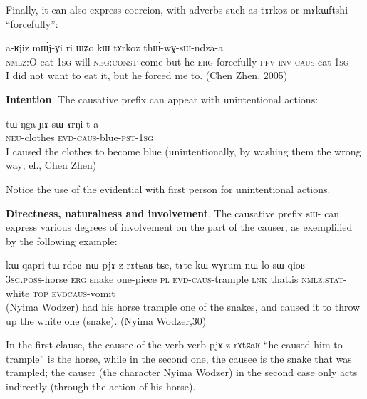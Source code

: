 \documentclass[oldfontcommands,oneside,a4paper,11pt]{article}
\newcommand{\ipa}[1]{{\phon \mbox{#1}}} %
\newcommand{\sg}{\textsc{sg}}
\newcommand{\pl}{\textsc{pl}}
\newcommand{\pfv}{\textsc{pfv}}
\newcommand{\auto}{\textsc{autoben}}
\newcommand{\caus}{\textsc{caus}}
\newcommand{\lnk}{\textsc{lnk}}
\newcommand{\testim}{\textsc{const}}
\newcommand{\erg}{\textsc{erg}}
\newcommand{\evd}{\textsc{evd}}
\newcommand{\inv}{\textsc{inv}}
\newcommand{\negat}{\textsc{neg}}
\newcommand{\neu}{\textsc{neu}}
\newcommand{\nmlz}{\textsc{nmlz}}
\newcommand{\poss}{\textsc{poss}}
\newcommand{\pst}{\textsc{pst}}
\newcommand{\stat}{\textsc{stat}}
\newcommand{\topic}{\textsc{top}}
\begin{document}
Finally, it can also express coercion, with adverbs such as \ipa{tɤrkoz} 	or \ipa{mɤkɯftshi} ``forcefully'':
 \begin{exe}
\ex 
\gll \ipa{kɤ-ndza} 	\ipa{a-ʁjiz} 	\ipa{mɯ́j-ɣi} 	\ipa{ri} 	\ipa{ɯʑo} 	\ipa{kɯ} 	\ipa{tɤrkoz} 	\ipa{thɯ́-wɣ-sɯ-ndza-a} \\
\nmlz{}:O-eat 1\sg{}-will \negat{}:\testim{}-come but he \erg{} forcefully \pfv{}-\inv{}-\caus{}-eat-1\sg{} \\
 \glt   I did not want to eat it, but he forced me to. (Chen Zhen, 2005)
\end{exe}

 
   \textbf{Intention}. The causative prefix can appear with unintentional actions:
 \begin{exe}
\ex 
\gll 
\ipa{tɯ-ŋga} 	\ipa{ɲɤ-sɯ-ɤrŋi-t-a} \\
	\neu{}-clothes \evd{}-\caus{}-blue-\pst{}-1\sg{} \\
 \glt   I caused the clothes to become blue (unintentionally, by washing them the wrong way; el., Chen Zhen)
\end{exe}
Notice the use of the evidential with first person for unintentional actions.
 	

   \textbf{Directness, naturalness and involvement}.  The causative prefix \ipa{sɯ-} can express various degrees of involvement on the part of the causer, as exemplified by the following example:
 
  \begin{exe}
\ex 
\gll \ipa{ɯ-mbro} 	\ipa{kɯ} 	\ipa{qapri} 	\ipa{tɯ-rdoʁ} 	\ipa{nɯ} 	\ipa{pjɤ-z-rɤtɕaʁ} 	\ipa{tɕe,} 	\ipa{tɤte} 	\ipa{kɯ-wɣrum} 	\ipa{nɯ} 	\ipa{lo-sɯ-qioʁ} \\
3\sg{}.\poss{}-horse \erg{} snake one-piece \pl{} \evd{}-\caus{}-trample \lnk{} that.is \nmlz{}:\stat{}-white \topic{} \evd{}\caus{}-vomit \\
 \glt  (Nyima Wodzer) had his horse trample one of the snakes, and caused it to throw up the white one (snake). (Nyima Wodzer,30)
\end{exe}
In the first  clause, the causee of the verb verb \ipa{pjɤ-z-rɤtɕaʁ} 	``he caused him to trample'' is the horse, while in the second one, the causee is the snake that was trampled; the causer (the character Nyima Wodzer) in the second case only acts indirectly (through the action of his horse).
 
\end{document}
